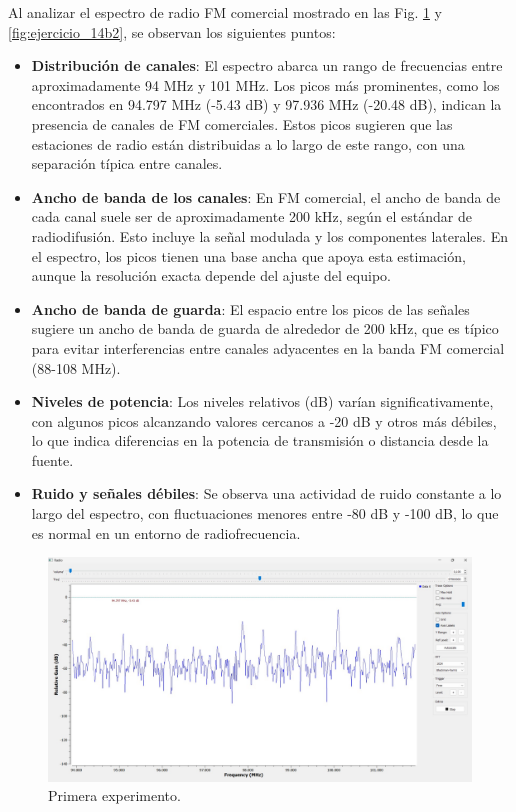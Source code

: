 Al analizar el espectro de radio FM comercial mostrado en las Fig. \ref{fig:ejercicio_14b1} y \ref{fig:ejercicio_14b2}, se observan los siguientes puntos:

\begin{itemize}
    \item \textbf{Distribución de canales}: El espectro abarca un rango de frecuencias entre aproximadamente 94 MHz y 101 MHz. Los picos más prominentes, como los encontrados en 94.797 MHz (-5.43 dB) y 97.936 MHz (-20.48 dB), indican la presencia de canales de FM comerciales. Estos picos sugieren que las estaciones de radio están distribuidas a lo largo de este rango, con una separación típica entre canales.
    
    \item \textbf{Ancho de banda de los canales}: En FM comercial, el ancho de banda de cada canal suele ser de aproximadamente 200 kHz, según el estándar de radiodifusión. Esto incluye la señal modulada y los componentes laterales. En el espectro, los picos tienen una base ancha que apoya esta estimación, aunque la resolución exacta depende del ajuste del equipo.
    
    \item \textbf{Ancho de banda de guarda}: El espacio entre los picos de las señales sugiere un ancho de banda de guarda de alrededor de 200 kHz, que es típico para evitar interferencias entre canales adyacentes en la banda FM comercial (88-108 MHz).
    
    \item \textbf{Niveles de potencia}: Los niveles relativos (dB) varían significativamente, con algunos picos alcanzando valores cercanos a -20 dB y otros más débiles, lo que indica diferencias en la potencia de transmisión o distancia desde la fuente.
    
    \item \textbf{Ruido y señales débiles}: Se observa una actividad de ruido constante a lo largo del espectro, con fluctuaciones menores entre -80 dB y -100 dB, lo que es normal en un entorno de radiofrecuencia.
\end{itemize}

\begin{figure}[H]
    \centering
    \includegraphics[width=0.9\linewidth]{imagenes/Parte_2/Actividad_14/14_b.jpg}
    \caption{Primera experimento.}
    \label{fig:ejercicio_14b1}
\end{figure}

